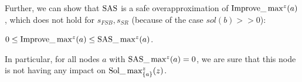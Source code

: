 Further, we can show that $\mathrm{SAS}$ is a safe overapproximation of 
$\mathrm{Improve}\_\max^z(a)$, which does not hold for $s_{FSB},s_{SR}$ (because of the case $sol(b)>>0$):

\begin{proposition}
	\label{prop2}
		$0 \leq \mathrm{Improve}\_\max^z(a) \leq \mathrm{SAS}\_\max^z(a)$. 
\end{proposition}


In particular, for all nodes $a$ with $\mathrm{SAS}\_\max\nolimits^z(a)=0$, 
we are sure that this node is not having any impact on $\mathrm{Sol}\_\max_{\{a\}}^z(z)$. 

	
%	
	
% 			


 



